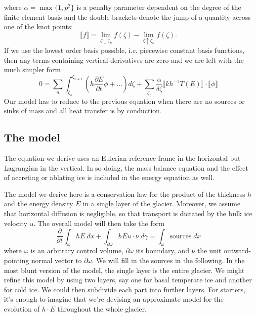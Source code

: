 \documentclass{article}
\theoremstyle{definition}
\theoremstyle{plain}
\begin{document}
where $\alpha = \max\{1, p^2\}$ is a penalty parameter dependent on the degree of the finite element basis and the double brackets denote the jump of a quantity across one of the knot points:
\begin{equation}
    \llbracket f\rrbracket = \lim_{\zeta\downarrow\zeta_n}f(\zeta) - \lim_{\zeta\uparrow\zeta_n}f(\zeta).
\end{equation}
If we use the lowest order basis possible, i.e. piecewise constant basis functions, then any terms containing vertical derivatives are zero and we are left with the much simpler form
\begin{equation}
    0 = \sum_n\int_{\zeta_n}^{\zeta_{n + 1}}\left(h\frac{\partial E}{\partial t}\phi + \ldots\right)d\zeta + \sum_{\zeta_n}\frac{\alpha}{\delta\zeta}\llbracket kh^{-1}T(E)\rrbracket\cdot\llbracket\phi\rrbracket
\end{equation}
Our model has to reduce to the previous equation when there are no sources or sinks of mass and all heat transfer is by conduction.


\subsection{The model}

The equation we derive uses an Eulerian reference frame in the horizontal but Lagrangian in the vertical.
In so doing, the mass balance equation and the effect of accreting or ablating ice is included in the energy equation as well.

The model we derive here is a conservation law for the product of the thickness $h$ and the energy density $E$ in a single layer of the glacier.
Moreover, we assume that horizontal diffusion is negligible, so that transport is dictated by the bulk ice velocity $u$.
The overall model will then take the form
\begin{equation}
    \frac{\partial}{\partial t}\int_\omega hE\;dx + \int_{\partial\omega}hEu\cdot\nu\;d\gamma = \int_\omega\text{sources}\;dx
\end{equation}
where $\omega$ is an arbitrary control volume, $\partial\omega$ its boundary, and $\nu$ the unit outward-pointing normal vector to $\partial\omega$.
We will fill in the sources in the following.
In the most blunt version of the model, the single layer is the entire glacier.
We might refine this model by using two layers, say one for basal temperate ice and another for cold ice.
We could then subdivide each part into further layers.
For starters, it's enough to imagine that we're devising an approximate model for the evolution of $h\cdot E$ throughout the whole glacier.
\end{document}
